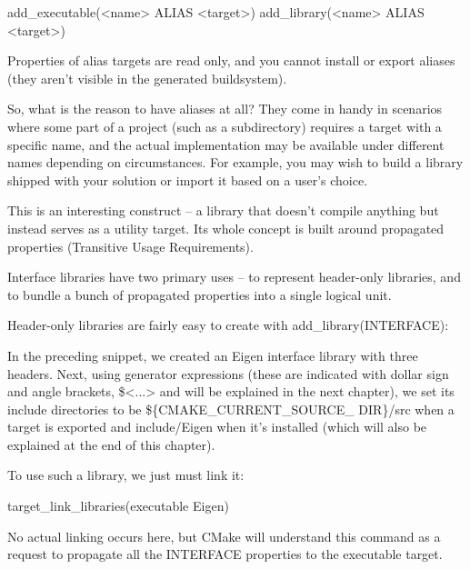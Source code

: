 \begin{shell}
add_executable(<name> ALIAS <target>)
add_library(<name> ALIAS <target>)
\end{shell}

Properties of alias targets are read only, and you cannot install or export aliases (they aren’t visible in the generated buildsystem).

So, what is the reason to have aliases at all? They come in handy in scenarios where some part of a project (such as a subdirectory) requires a target with a specific name, and the actual implementation may be available under different names depending on circumstances. For example, you may wish to build a library shipped with your solution or import it based on a user’s choice.


This is an interesting construct – a library that doesn’t compile anything but instead serves as a utility target. Its whole concept is built around propagated properties (Transitive Usage Requirements).

Interface libraries have two primary uses – to represent header-only libraries, and to bundle a bunch of propagated properties into a single logical unit.

Header-only libraries are fairly easy to create with add\_library(INTERFACE):


In the preceding snippet, we created an Eigen interface library with three headers. Next, using generator expressions (these are indicated with dollar sign and angle brackets, \$<...> and will be explained in the next chapter), we set its include directories to be \$\{CMAKE\_CURRENT\_SOURCE\_ DIR\}/src when a target is exported and include/Eigen when it’s installed (which will also be explained at the end of this chapter).

To use such a library, we just must link it:

\begin{cmake}
target_link_libraries(executable Eigen)
\end{cmake}

No actual linking occurs here, but CMake will understand this command as a request to propagate all the INTERFACE properties to the executable target.

